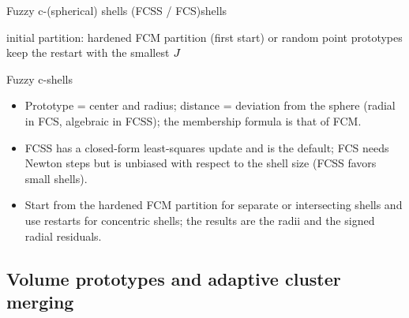 \begin{algobox}{Fuzzy c-(spherical) shells (FCSS / FCS)}{shells}
\begin{algorithm}[H]
initial partition: hardened FCM partition (first start) or random point prototypes\;
keep the restart with the smallest $J$\;
\end{algorithm}
\end{algobox}
\begin{summarybox}{Fuzzy c-shells}
\begin{itemize}
  \item Prototype = center and radius; distance = deviation from the sphere (radial in FCS, algebraic in FCSS); the membership formula is that of FCM.
  \item FCSS has a closed-form least-squares update and is the default; FCS needs Newton steps but is unbiased with respect to the shell size (FCSS favors small shells).
  \item Start from the hardened FCM partition for separate or intersecting shells and use restarts for concentric shells; the results are the radii and the signed radial residuals.
\end{itemize}
\end{summarybox}

\subsection{Volume prototypes and adaptive cluster merging}\label{sec:robust:volume}

